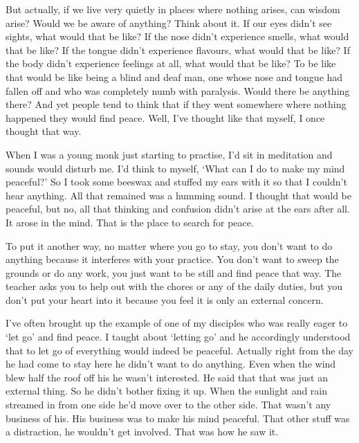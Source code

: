But actually, if we live very quietly in places where nothing arises, can wisdom arise? Would we be aware of anything? Think about it. If our eyes didn't see sights, what would that be like? If the nose didn't experience smells, what would that be like? If the tongue didn't experience flavours, what would that be like? If the body didn't experience feelings at all, what would that be like? To be like that would be like being a blind and deaf man, one whose nose and tongue had fallen off and who was completely numb with paralysis. Would there be anything there? And yet people tend to think that if they went somewhere where nothing happened they would find peace. Well, I've thought like that myself, I once thought that way.

When I was a young monk just starting to practise, I'd sit in meditation and sounds would disturb me. I'd think to myself, `What can I do to make my mind peaceful?' So I took some beeswax and stuffed my ears with it so that I couldn't hear anything. All that remained was a humming sound. I thought that would be peaceful, but no, all that thinking and confusion didn't arise at the ears after all. It arose in the mind. That is the place to search for peace.

To put it another way, no matter where you go to stay, you don't want to do anything because it interferes with your practice. You don't want to sweep the grounds or do any work, you just want to be still and find peace that way. The teacher asks you to help out with the chores or any of the daily duties, but you don't put your heart into it because you feel it is only an external concern.

I've often brought up the example of one of my disciples who was really eager to `let go' and find peace. I taught about `letting go' and he accordingly understood that to let go of everything would indeed be peaceful. Actually right from the day he had come to stay here he didn't want to do anything. Even when the wind blew half the roof off his  he wasn't interested. He said that that was just an external thing. So he didn't bother fixing it up. When the sunlight and rain streamed in from one side he'd move over to the other side. That wasn't any business of his. His business was to make his mind peaceful. That other stuff was a distraction, he wouldn't get involved. That was how he saw it.

